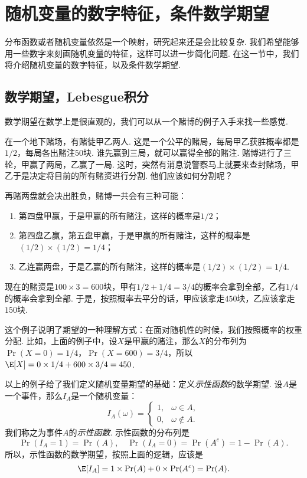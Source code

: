 \section{随机变量的数字特征，条件数学期望}\label{sec:expectation}

分布函数或者随机变量依然是一个映射，研究起来还是会比较复杂. 我们希望能够用一些数字来刻画随机变量的特征，这样可以进一步简化问题. 在这一节中，我们将介绍随机变量的数字特征，以及条件数学期望. 

\subsection{数学期望，Lebesgue积分}

数学期望在数学上是很直观的，我们可以从一个赌博的例子入手来找一些感觉. 

\begin{example}
在一个地下赌场，有赌徒甲乙两人. 这是一个公平的赌局，每局甲乙获胜概率都是$1/2$，每局各出赌注$50$块. 谁先赢到三局，就可以赢得全部的赌注. 赌博进行了三轮，甲赢了两局，乙赢了一局. 这时，突然有消息说警察马上就要来查封赌场，甲乙于是决定将目前的所有赌资进行分割. 他们应该如何分割呢？

再赌两盘就会决出胜负，赌博一共会有三种可能：
\begin{enumerate}
    \item 第四盘甲赢，于是甲赢的所有赌注，这样的概率是$1/2$；
    \item 第四盘乙赢，第五盘甲赢，于是甲赢的所有赌注，这样的概率是$(1/2)\times(1/2)=1/4$；
    \item 乙连赢两盘，于是乙赢的所有赌注，这样的概率是$(1/2)\times(1/2)=1/4$. 
\end{enumerate}
现在的赌资是$100\times 3=600$块，甲有$1/2+1/4=3/4$的概率会拿到全部，乙有$1/4$的概率会拿到全部. 于是，按照概率去平分的话，甲应该拿走$450$块，乙应该拿走$150$块. 
\end{example}

这个例子说明了期望的一种理解方式：在面对随机性的时候，我们按照概率的权重分配. 比如，上面的例子中，设$X$是甲赢的赌注，那么$X$的分布列为$\Pr(X=0)=1/4$，$\Pr(X=600)=3/4$，所以$\E[X]=0\times 1/4+600\times 3/4=450$.

以上的例子给了我们定义随机变量期望的基础：定义\emph{示性函数}的数学期望. 设$A$是一个事件，那么$I_A$是一个随机变量：
\[I_A(\omega)=\begin{cases}
    1,&\omega\in A,\\
    0,&\omega\notin A.
\end{cases}\]
我们称之为事件$A$的\emph{示性函数}. 示性函数的分布列是
\[\Pr(I_A=1)=\Pr(A),\quad \Pr(I_A=0)=\Pr(A^c)=1-\Pr(A).\]
所以，示性函数的数学期望，按照上面的逻辑，应该是
\[\E[I_A]=1\times\Pr(A)+0\times\Pr(A^c)=\Pr(A).\]

